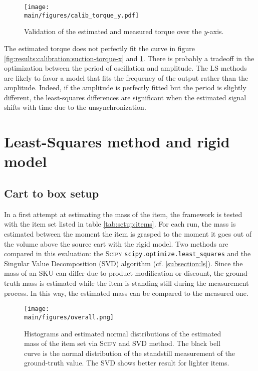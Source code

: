 \documentclass[/home/francois/latex/report/main.tex]{subfiles}
\begin{document}
\begin{figure}[h]
  \centering
  \texttt{[image: \\main/figures/calib\_torque\_y.pdf]}
  \caption{Validation of the estimated and measured torque over the $y$-axis.}
  \label{fig:results:calibration:suction-torque-y}
\end{figure}

The estimated torque does not perfectly fit the curve in figure \ref{fig:results:calibration:suction-torque-x} and \ref{fig:results:calibration:suction-torque-y}. There is probably a tradeoff in the optimization between the period of oscillation and amplitude. The \ac{LS} methods are likely to favor a model that fits the frequency of the output rather than the amplitude. Indeed, if the amplitude is perfectly fitted but the period is slightly different, the least-squares differences are significant when the estimated signal shifts with time due to the unsynchronization.

\section{Least-Squares method and rigid model}

\subsection{Cart to box setup}

In a first attempt at estimating the mass of the item, the framework is tested with the item set listed in table \ref{tab:setup:items}. For each run, the mass is estimated between the moment the item is grasped to the moment it goes out of the volume above the source cart with the rigid model. Two methods are compared in this evaluation: the \textsc{Scipy} \texttt{scipy.optimize.least\_squares} and the Singular Value Decomposition (SVD) algorithm (cf. \ref{subsection:ls}). Since the mass of an \ac{SKU} can differ due to product modification or discount, the ground-truth mass is estimated while the item is standing still during the measurement process. In this way, the estimated mass can be compared to the measured one.

\begin{figure}[H]
  \centering
  \texttt{[image: \\main/figures/overall.png]}
  \caption{Histograms and estimated normal distributions of the estimated mass of the item set via \textsc{Scipy} and \ac{SVD} method. The black bell curve is the normal distribution of the standstill measurement of the ground-truth value. The \ac{SVD} shows better result for lighter items.}
  \label{fig:results:rigid-ls}
\end{figure}
\end{document}
